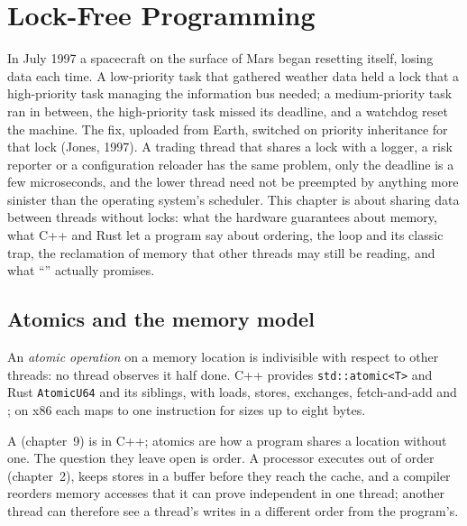 \chapter{Lock-Free Programming}\label{ch:ll:lock-free-programming}

In July 1997 a spacecraft on the surface of Mars began resetting itself, losing data each time. A low-priority task that
gathered weather data held a lock that a high-priority task managing the information bus needed; a medium-priority task
ran in between, the high-priority task missed its deadline, and a watchdog reset the machine. The fix, uploaded from
Earth, switched on priority inheritance for that lock (Jones, 1997). A trading thread that shares a lock with a logger,
a risk reporter or a configuration reloader has the same problem, only the deadline is a few microseconds, and the lower
thread need not be preempted by anything more sinister than the operating system's scheduler. This chapter is about
sharing data between threads without locks: what the hardware guarantees about memory, what C++ and Rust let a program
say about ordering, the  loop and its classic trap, the reclamation of memory that other threads may
still be reading, and what ``'' actually promises.

\section{Atomics and the memory model}

\begin{definition}\label{def:ll:lock-free-programming:atomic}
An \emph{atomic operation} on a memory location is indivisible with respect to other threads: no
thread observes it half done. C++ provides \texttt{std::atomic<T>} and Rust \texttt{AtomicU64} and its siblings, with
loads, stores, exchanges, fetch-and-add and ; on x86 each maps to one instruction for sizes up to eight
bytes.
\end{definition}

A  (chapter~9) is  in C++; atomics are how a program shares a location without one. The
question they leave open is order. A processor executes out of order (chapter~2), keeps stores in a buffer before they
reach the cache, and a compiler reorders memory accesses that it can prove independent in one thread; another thread can
therefore see a thread's writes in a different order from the program's.

